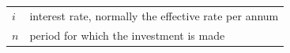 \begin{itemize}[noitemsep]
{\begin{tabular}[t]{|l|l|}
    
        
                  \begin{math}i\end{math}
                 &
    
    
        interest rate, normally the effective rate per annum%
     \tabularnewline\cline{1-1}\cline{2-2}
    
    
        
                  \begin{math}n\end{math}
                 &
    
    
        period for which the investment is made%
     \tabularnewline\cline{1-1}\cline{2-2}
    \end{tabular}} %
\end{itemize}
